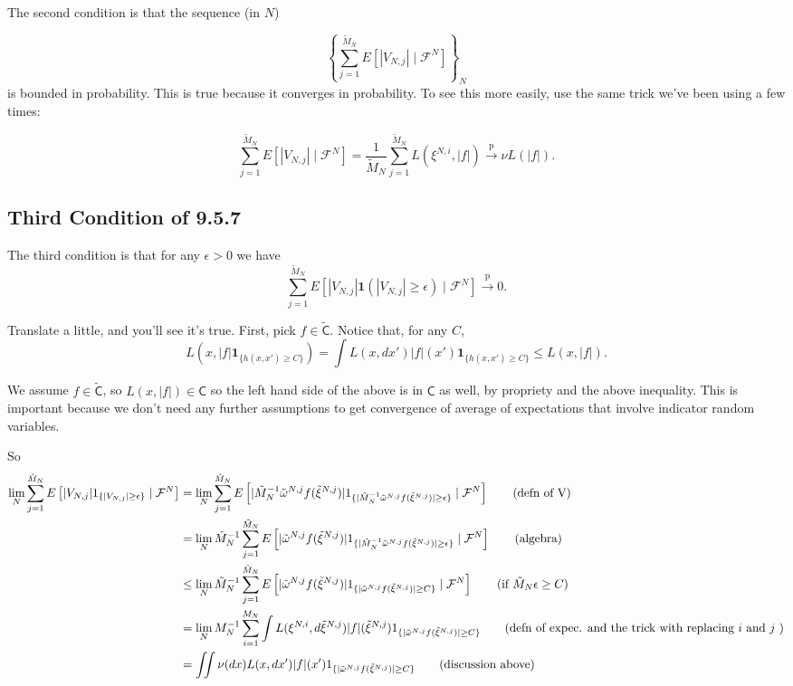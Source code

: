 \documentclass{article}
\begin{document}
The second condition is that the sequence (in $N$) 

$$
\left\{ \sum_{j=1}^{\tilde{M}_N} E[|V_{N,j}| \mid \mathcal{F}^N] \right\}_N
$$
is bounded in probability. This is true because it converges in probability. To see this more easily, use the same trick we've been using a few times:

$$
\sum_{j=1}^{\tilde{M}_N} E[|V_{N,j}| \mid \mathcal{F}^N] = \frac{1}{\tilde{M}_N} \sum_{j=1}^{\tilde{M}_N} L(\xi^{N,i}, |f|) \overset{\text{p}}{\to} \nu L(|f|).
$$


\subsection{Third Condition of 9.5.7}

The third condition is that for any $\epsilon > 0$ we have
$$
\sum_{j=1}^{\tilde{M}_N} E\left[ |V_{N,j}| \mathbf{1}\left( |V_{N,j}| \ge \epsilon \right)  \mid \mathcal{F}^N\right] \overset{\text{p}}{\to} 0.
$$

Translate a little, and you'll see it's true. First, pick $f \in \tilde{\mathsf{C}}$. Notice that, for any $C$,
$$
L(x,|f| \mathbf{1}_{\{h(x,x') \ge C \}}) = \int L(x, dx')|f|(x') \mathbf{1}_{\{ h(x,x') \ge C \}} \le L(x, |f|).
$$

We assume $f \in \tilde{\mathsf{C}}$, so $ L(x, |f|) \in \mathsf{C}$ so the left hand side of the above is in $\mathsf{C}$ as well, by propriety and the above inequality. This is important because we don't need any further assumptions to get convergence of average of expectations that involve indicator random variables.

So
\begin{align*}
\lim_N \sum_{j=1}^{\tilde{M}_N} E\left[ |V_{N,j}| 1_{\{|V_{N,j}| \ge \epsilon \} } \mid \mathcal{F}^N\right] 
&= \lim_N \sum_{j=1}^{\tilde{M}_N} E\left[ |\tilde{M}_N^{-1} \tilde{\omega}^{N,j} f(\tilde{\xi}^{N,j})| 1_{\{|\tilde{M}_N^{-1} \tilde{\omega}^{N,j} f(\tilde{\xi}^{N,j})| \ge \epsilon \} } \mid \mathcal{F}^N\right] \tag{defn of V}\\
&= \lim_N \tilde{M}_N^{-1}\sum_{j=1}^{\tilde{M}_N} E\left[ | \tilde{\omega}^{N,j} f(\tilde{\xi}^{N,j})| 1_{\{|\tilde{M}_N^{-1} \tilde{\omega}^{N,j} f(\tilde{\xi}^{N,j})| \ge \epsilon \} } \mid \mathcal{F}^N\right] \tag{algebra} \\
&\le \lim_N \tilde{M}_N^{-1}\sum_{j=1}^{\tilde{M}_N} E\left[ | \tilde{\omega}^{N,j} f(\tilde{\xi}^{N,j})| 1_{\{| \tilde{\omega}^{N,j} f(\tilde{\xi}^{N,j})| \ge C \} } \mid \mathcal{F}^N\right] \tag{if $\tilde{M}_N \epsilon \ge C$} \\
&= \lim_N M_N^{-1}\sum_{i=1}^{M_N} \int L(\xi^{N,i}, d \tilde{\xi}^{N,j}) |f|(\tilde{\xi}^{N,j}) 1_{\{| \tilde{\omega}^{N,j} f(\tilde{\xi}^{N,j})| \ge C \} }  \tag{defn of expec. and the trick with replacing $i$ and $j$ }\\
&= \iint \nu(dx) L(x, d x') |f|(x') 1_{\{| \tilde{\omega}^{N,j} f(\tilde{\xi}^{N,j})| \ge C \} }  \tag{discussion above}\\
\end{align*}
\end{document}
